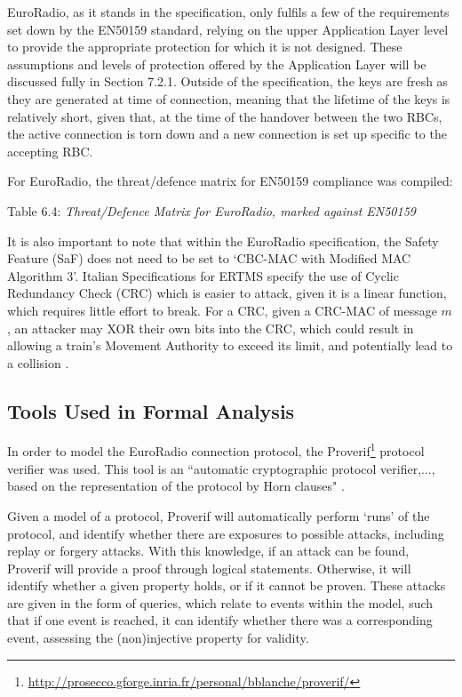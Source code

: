 \documentclass[twoside,11pt,a4paper]{article}
\begin{document}
EuroRadio, as it stands in the specification, only fulfils a few of the requirements set down by the EN50159 standard, relying on the upper Application Layer level to provide the appropriate protection for which it is not designed. These assumptions and levels of protection offered by the Application Layer will be discussed fully in Section 7.2.1. Outside of the specification, the keys are fresh as they are generated at time of connection, meaning that the lifetime of the keys is relatively short, given that, at the time of the handover between the two RBCs, the active connection is torn down \citep[Section 3.15.1.3]{SUBSET-026-3} and a new connection is set up specific to the accepting RBC.

For EuroRadio, the threat/defence matrix for EN50159 compliance was compiled:

\begin{center}
\vspace{-1.0cm}
Table 6.4: \textit{Threat/Defence Matrix for EuroRadio, marked against EN50159}
\end{center}

It is also important to note that within the EuroRadio specification, the Safety Feature (SaF) does not need to be set to `CBC-MAC with Modified MAC Algorithm 3'. Italian Specifications for ERTMS specify the use of Cyclic Redundancy Check (CRC) which is easier to attack, given it is a linear function, which requires little effort to break. For a CRC, given a CRC-MAC of message $m$, an attacker may XOR their own bits into the CRC, which could result in allowing a train's Movement Authority to exceed its limit, and potentially lead to a collision \citep{Ferrovia09a} \citep{Lockstone00a}.

\subsection{Tools Used in Formal Analysis}
In order to model the EuroRadio connection protocol, the Proverif\footnote{\url{http://prosecco.gforge.inria.fr/personal/bblanche/proverif/}} protocol verifier was used. This tool is an ``automatic cryptographic protocol verifier,..., based on the representation of the protocol by Horn clauses" \citep{Proverif}.

Given a model of a protocol, Proverif will automatically perform `runs' of the protocol, and identify whether there are exposures to possible attacks, including replay or forgery attacks. With this knowledge, if an attack can be found, Proverif will provide a proof through logical statements. Otherwise, it will identify whether a given property holds, or if it cannot be proven. These attacks are given in the form of queries, which relate to events within the model, such that if one event is reached, it can identify whether there was a corresponding event, assessing the (non)injective property for validity.
\end{document}
